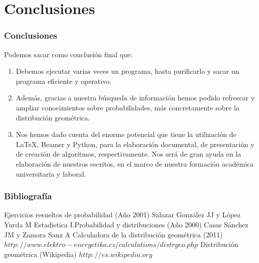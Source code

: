 \documentclass{beamer}
\begin{document}
\section {Conclusiones}
\begin{frame}
\frametitle{Conclusiones}
Podemos sacar como conclusión final que:
\begin{enumerate}
  \item Debemos ejecutar varias veces un programa, hasta purificarlo y sacar un programa eficiente y operativo. \pause
  \item Además, gracias a nuestra búsqueda de información hemos podido refrescar y ampliar conocimientos sobre probabilidades, más concretamente sobre la distribución geométrica. \pause
   \item Nos hemos dado cuenta del enorme potencial que tiene la utilización de \LaTeX, Beamer y Python, para la elaboración documental, de presentación y de creación de algoritmos, respectivamente. Nos será de gran ayuda en la elaboración de nuestros escritos, en el marco de nuestra formación académica universitaria y laboral.
\end{enumerate}
\end{frame}
\begin{frame}
\frametitle{Bibliografía}
\begin{thebibliography} %
\beamertermplatebookbibitems
{}
Ejercicios resueltos de probabilidad (Año 2001)
{\small Salazar Gonz\'alez JJ y L\'opez Yurda M}
Estadistica I.Probabilidad y distribuciones (Año 2000)
{\small Casas  S\'anchez JM y Zamora  Sanz A}
 Calculadora de la distribución geométrica (2011)
{\small $http://www.elektro-energetika.cz/calculations/distrgeo.php$}
 Distribución geométrica (Wikipedia)
{\small $http://es.wikipedia.org$}
\end{thebibliography}
\end{frame}
\end{document}
